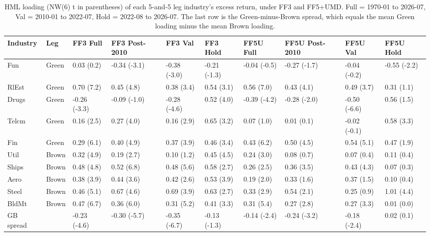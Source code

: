 \begin{table}
\caption{HML loading (NW(6) t in parentheses) of each 5-and-5 leg industry's excess return, under FF3 and FF5+UMD. Full = 1970-01 to 2026-07, Val = 2010-01 to 2022-07, Hold = 2022-08 to 2026-07. The last row is the Green-minus-Brown spread, which equals the mean Green loading minus the mean Brown loading.}
\label{tab:m2_industry_hml}
\begin{tabular}{llllllllll}
\toprule
Industry & Leg & FF3 Full & FF3 Post-2010 & FF3 Val & FF3 Hold & FF5U Full & FF5U Post-2010 & FF5U Val & FF5U Hold \\
\midrule
Fun & Green & 0.03 (0.2) & -0.34 (-3.1) & -0.38 (-3.0) & -0.21 (-1.3) & -0.04 (-0.5) & -0.27 (-1.7) & -0.04 (-0.2) & -0.55 (-2.2) \\
RlEst & Green & 0.70 (7.2) & 0.45 (4.8) & 0.38 (3.4) & 0.54 (3.1) & 0.56 (7.0) & 0.43 (4.1) & 0.49 (3.7) & 0.31 (1.1) \\
Drugs & Green & -0.26 (-3.3) & -0.09 (-1.0) & -0.28 (-4.6) & 0.52 (4.0) & -0.39 (-4.2) & -0.28 (-2.0) & -0.50 (-6.6) & 0.56 (1.5) \\
Telcm & Green & 0.16 (2.5) & 0.27 (4.0) & 0.16 (2.9) & 0.65 (3.2) & 0.07 (1.0) & 0.01 (0.1) & -0.02 (-0.1) & 0.58 (3.3) \\
Fin & Green & 0.29 (6.1) & 0.40 (4.9) & 0.37 (3.9) & 0.46 (3.4) & 0.43 (6.2) & 0.50 (4.5) & 0.54 (5.1) & 0.47 (1.9) \\
Util & Brown & 0.32 (4.9) & 0.19 (2.7) & 0.10 (1.2) & 0.45 (4.5) & 0.24 (3.0) & 0.08 (0.7) & 0.07 (0.4) & 0.11 (0.4) \\
Ships & Brown & 0.48 (4.8) & 0.52 (6.8) & 0.48 (5.6) & 0.58 (2.7) & 0.26 (2.5) & 0.36 (3.5) & 0.43 (4.3) & 0.07 (0.3) \\
Aero & Brown & 0.38 (3.9) & 0.44 (3.6) & 0.42 (2.6) & 0.53 (3.9) & 0.19 (2.0) & 0.33 (1.6) & 0.37 (1.5) & 0.10 (0.4) \\
Steel & Brown & 0.46 (5.1) & 0.67 (4.6) & 0.69 (3.9) & 0.63 (2.7) & 0.33 (2.9) & 0.54 (2.1) & 0.25 (0.9) & 1.01 (4.4) \\
BldMt & Brown & 0.47 (6.7) & 0.36 (6.0) & 0.31 (5.2) & 0.41 (3.3) & 0.31 (5.4) & 0.27 (2.8) & 0.27 (3.3) & 0.01 (0.0) \\
GB spread &  & -0.23 (-4.6) & -0.30 (-5.7) & -0.35 (-6.7) & -0.13 (-1.3) & -0.14 (-2.4) & -0.24 (-3.2) & -0.18 (-2.4) & 0.02 (0.1) \\
\bottomrule
\end{tabular}
\end{table}
